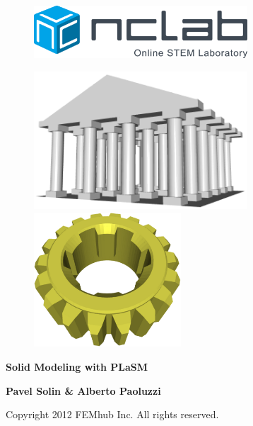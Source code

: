 \documentclass{article}
\newif\iffullversion
\begin{document}
\large

\vbox{}
\begin{figure}[!ht]
\includegraphics[width=8cm]{img/logo.png}
\vspace{18mm}
\end{figure}

\begin{figure}[!ht]
\begin{center}
\includegraphics[width=8cm]{img/plasm-temple.png}\hspace{1cm}
\includegraphics[width=5.5cm]{img/plasm-frontpage.png}
\vspace{15mm}
\end{center}
\end{figure}

\begin{center}
{\Huge \bf Solid Modeling with PLaSM}\\
\vbox{}
\vspace{1.4cm}
\iffullversion
\else
\centerline{\huge \color{red}{PREVIEW}}
\fi
\vfill
{\large
{\bf Pavel Solin \& Alberto Paoluzzi}
}
\end{center}
\vfill
\vfill
\begin{center}
Copyright 2012 FEMhub Inc. All rights reserved.
\end{center}
\newpage
\end{document}
